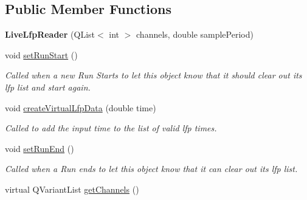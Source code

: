\subsection*{Public Member Functions}
\begin{DoxyCompactItemize}
\item 
\hypertarget{class_picto_1_1_live_lfp_reader_a19ca9204ad3e71e7602a9106d3b39ec8}{{\bfseries Live\-Lfp\-Reader} (Q\-List$<$ int $>$ channels, double sample\-Period)}\label{class_picto_1_1_live_lfp_reader_a19ca9204ad3e71e7602a9106d3b39ec8}

\item 
\hypertarget{class_picto_1_1_live_lfp_reader_a22b661f0ab2d4696e1051279bc0ad0e2}{void \hyperlink{class_picto_1_1_live_lfp_reader_a22b661f0ab2d4696e1051279bc0ad0e2}{set\-Run\-Start} ()}\label{class_picto_1_1_live_lfp_reader_a22b661f0ab2d4696e1051279bc0ad0e2}

\begin{DoxyCompactList}\small\item\em Called when a new Run Starts to let this object know that it should clear out its lfp list and start again. \end{DoxyCompactList}\item 
void \hyperlink{class_picto_1_1_live_lfp_reader_a590e34f75db45fbcf5260b0fba777233}{create\-Virtual\-Lfp\-Data} (double time)
\begin{DoxyCompactList}\small\item\em Called to add the input time to the list of valid lfp times. \end{DoxyCompactList}\item 
\hypertarget{class_picto_1_1_live_lfp_reader_af7eb961b3f58cfc1a22586aea0d3dc2d}{void \hyperlink{class_picto_1_1_live_lfp_reader_af7eb961b3f58cfc1a22586aea0d3dc2d}{set\-Run\-End} ()}\label{class_picto_1_1_live_lfp_reader_af7eb961b3f58cfc1a22586aea0d3dc2d}

\begin{DoxyCompactList}\small\item\em Called when a Run ends to let this object know that it can clear out its lfp list. \end{DoxyCompactList}\item 
\hypertarget{class_picto_1_1_live_lfp_reader_a5586589c5cf363d246f9b6c34de1fba5}{virtual Q\-Variant\-List \hyperlink{class_picto_1_1_live_lfp_reader_a5586589c5cf363d246f9b6c34de1fba5}{get\-Channels} ()}\label{class_picto_1_1_live_lfp_reader_a5586589c5cf363d246f9b6c34de1fba5}


\end{DoxyCompactItemize}
